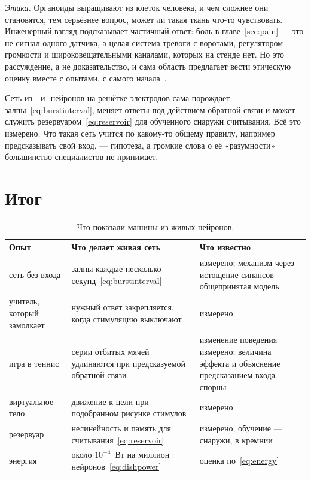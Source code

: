 \emph{Этика.} Органоиды выращивают из клеток человека, и чем сложнее они становятся, тем серьёзнее вопрос, может ли такая ткань что-то чувствовать. Инженерный взгляд подсказывает частичный ответ: боль в главе~\ref{sec:pain} --- это не сигнал одного датчика, а целая система тревоги с воротами, регулятором громкости и широковещательными каналами, которых на стенде нет. Но это рассуждение, а не доказательство, и сама область предлагает вести этическую оценку вместе с опытами, с самого начала~\cite{Smirnova2023}.

\begin{keyblock}
\begin{proposition}
\label{prop:livingmachine}
Сеть из - и -нейронов на решётке электродов сама порождает залпы~\eqref{eq:burstinterval}, меняет ответы под действием обратной связи и может служить резервуаром~\eqref{eq:reservoir} для обученного снаружи считывания. Всё это измерено. Что такая сеть учится по какому-то общему правилу, например предсказывать свой вход, --- гипотеза, а громкие слова о её «разумности» большинство специалистов не принимает.
\end{proposition}
\end{keyblock}

\section{Итог}

\begin{table}[t]
\centering
\footnotesize
\setlength{\tabcolsep}{4pt}
\renewcommand{\arraystretch}{1.15}
\begin{tabular}{>{\raggedright}p{2.8cm}>{\raggedright}p{4.2cm}>{\raggedright\arraybackslash}p{5.8cm}}
\toprule
Опыт & Что делает живая сеть & Что известно \\
\midrule
сеть без входа & залпы каждые несколько секунд~\eqref{eq:burstinterval} & измерено; механизм через истощение синапсов --- общепринятая модель \\
учитель, который замолкает & нужный ответ закрепляется, когда стимуляцию выключают & измерено \\
игра в теннис & серии отбитых мячей удлиняются при предсказуемой обратной связи & изменение поведения измерено; величина эффекта и объяснение предсказанием входа спорны \\
виртуальное тело & движение к цели при подобранном рисунке стимулов & измерено \\
резервуар & нелинейность и память для считывания~\eqref{eq:reservoir} & измерено; обучение --- снаружи, в кремнии \\
энергия & около $10^{-4}$~Вт на миллион нейронов~\eqref{eq:dishpower} & оценка по~\eqref{eq:energy} \\
\bottomrule
\end{tabular}
\caption{Что показали машины из живых нейронов.}
\label{tab:livingmachine}
\end{table}

